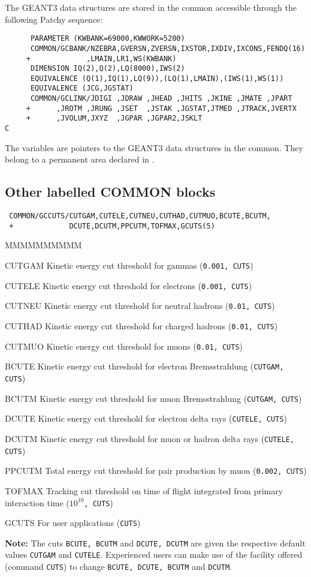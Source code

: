 The GEANT3 data structures are stored in the
common  accessible through the following Patchy sequence:
\begin{verbatim}
      PARAMETER (KWBANK=69000,KWWORK=5200)
      COMMON/GCBANK/NZEBRA,GVERSN,ZVERSN,IXSTOR,IXDIV,IXCONS,FENDQ(16)
     +             ,LMAIN,LR1,WS(KWBANK)
      DIMENSION IQ(2),Q(2),LQ(8000),IWS(2)
      EQUIVALENCE (Q(1),IQ(1),LQ(9)),(LQ(1),LMAIN),(IWS(1),WS(1))
      EQUIVALENCE (JCG,JGSTAT)
      COMMON/GCLINK/JDIGI ,JDRAW ,JHEAD ,JHITS ,JKINE ,JMATE ,JPART
     +      ,JROTM ,JRUNG ,JSET  ,JSTAK ,JGSTAT,JTMED ,JTRACK,JVERTX
     +      ,JVOLUM,JXYZ  ,JGPAR ,JGPAR2,JSKLT
C
\end{verbatim}
The  variables are pointers to the GEANT3 data structures in
the  common.
They belong to a permanent area declared in .
\subsection{Other labelled COMMON blocks}
\begin{verbatim}
 COMMON/GCCUTS/CUTGAM,CUTELE,CUTNEU,CUTHAD,CUTMUO,BCUTE,BCUTM,
 +             DCUTE,DCUTM,PPCUTM,TOFMAX,GCUTS(5)
\end{verbatim}
\begin{DLtt}{MMMMMMMMMM}
\item[CUTGAM]    Kinetic energy cut threshold for gammas
({\tt 0.001, CUTS})
\item[CUTELE]    Kinetic energy cut threshold for electrons
({\tt 0.001, CUTS})
\item[CUTNEU]    Kinetic energy cut threshold for neutral hadrons
({\tt 0.01, CUTS})
\item[CUTHAD]    Kinetic energy cut threshold for charged hadrons
({\tt 0.01, CUTS})
\item[CUTMUO]    Kinetic energy cut threshold for muons
({\tt 0.01, CUTS})
\item[BCUTE]     Kinetic energy cut threshold for electron
                 Bremsstrahlung ({\tt CUTGAM, CUTS})
\item[BCUTM]    Kinetic energy cut threshold for muon Bremsstrahlung
({\tt CUTGAM, CUTS})
\item[DCUTE]   Kinetic energy cut threshold for electron delta rays
({\tt CUTELE, CUTS})
\item[DCUTM]  Kinetic energy cut threshold for muon or hadron delta rays
({\tt CUTELE, CUTS})
\item[PPCUTM] Total energy cut threshold for \Pep\Pem pair production by
              muon ({\tt 0.002, CUTS})
\item[TOFMAX]  Tracking cut threshold on time of flight integrated
from primary interaction time ({\tt $10^{10}$, CUTS})
\item[GCUTS]   For user applications   ({\tt CUTS})
\end{DLtt}
{\bf Note:}
The cuts {\tt BCUTE, BCUTM} and {\tt DCUTE, DCUTM} are given
the respective default values {\tt CUTGAM} and {\tt CUTELE}.
Experienced
users can make use of the facility offered (command {\tt CUTS})
to change {\tt BCUTE, DCUTE, BCUTM} and {\tt DCUTM}.
 
